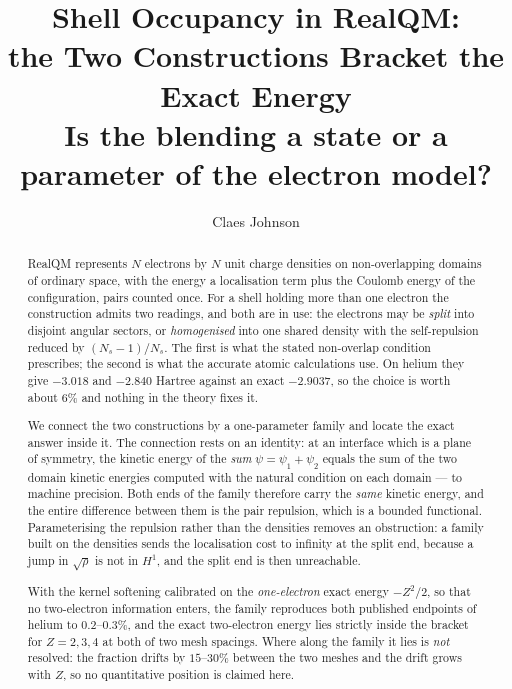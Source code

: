 \documentclass[11pt]{article}
\title{Shell Occupancy in RealQM:\\the Two Constructions Bracket the Exact Energy\\
\large Is the blending a state or a parameter of the electron model?}
\author[1]{Claes Johnson}
\affil[1]{\small Royal Institute of Technology, Stockholm (emeritus)}
\date{}
\begin{document}
\maketitle

\begin{abstract}
RealQM represents $N$ electrons by $N$ unit charge densities on non-overlapping domains of ordinary
space, with the energy a localisation term plus the Coulomb energy of the configuration, pairs
counted once. For a shell holding more than one electron the construction admits two readings, and
both are in use: the electrons may be \emph{split} into disjoint angular sectors, or
\emph{homogenised} into one shared density with the self-repulsion reduced by $(N_s-1)/N_s$. The
first is what the stated non-overlap condition prescribes; the second is what the accurate atomic
calculations use. On helium they give $-3.018$ and $-2.840$ Hartree against an exact $-2.9037$, so
the choice is worth about $6\%$ and nothing in the theory fixes it.

We connect the two constructions by a one-parameter family and locate the exact answer inside it.
The connection rests on an identity: at an interface which is a plane of symmetry, the kinetic energy
of the \emph{sum} $\psi=\psi_1+\psi_2$ equals the sum of the two domain kinetic energies computed
with the natural condition on each domain --- to machine precision. Both ends of the family
therefore carry the \emph{same} kinetic energy, and the entire difference between them is the pair
repulsion, which is a bounded functional. Parameterising the repulsion rather than the densities
removes an obstruction: a family built on the densities sends the localisation cost to infinity at
the split end, because a jump in $\sqrt{\rho}$ is not in $H^1$, and the split end is then unreachable.

With the kernel softening calibrated on the \emph{one-electron} exact energy $-Z^2/2$, so that no
two-electron information enters, the family reproduces both published endpoints of helium to
$0.2$--$0.3\%$, and the exact two-electron energy lies strictly inside the bracket for $Z=2,3,4$ at
both of two mesh spacings. Where along the family it lies is \emph{not} resolved: the fraction drifts
by $15$--$30\%$ between the two meshes and the drift grows with $Z$, so no quantitative position is
claimed here.


\end{abstract}
\end{document}
